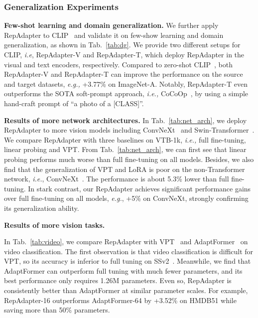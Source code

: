  \subsubsection{Generalization Experiments}

  \textbf{Few-shot learning and domain generalization.} We further apply RepAdapter to CLIP~\cite{clip} and validate it on few-show learning and domain generalization, as shown in Tab.~\ref{tab:dg}.
We provide two different setups for CLIP, \emph{i.e},  RepAdapter-V and RepAdapter-T,  which deploy  RepAdapter in the visual  and text encoders, respectively.  Compared to zero-shot CLIP~\cite{clip},  both  RepAdapter-V and  RepAdapter-T can improve the performance on the source   and  target datasets, \emph{e.g.,}  +3.77\% on ImageNet-A.   Notably,   RepAdapter-T   even outperforms the  SOTA  soft-prompt approach, \emph{i.e.,} CoCoOp~\cite{cocoop}, by using  a simple  hand-craft prompt of  ``a photo of a [CLASS]''.   

   \textbf{Results of more network architectures.} In Tab.~\ref{tab:net_arch}, we deploy RepAdapter to more    vision models including   ConvNeXt~\cite{convnext} and Swin-Transformer~\cite{swin}. We compare RepAdapter with three baselines on VTB-1k, \emph{i.e.,}   full fine-tuning,   linear probing and VPT.  From Tab.~\ref{tab:net_arch}, we can first see that linear probing performs much worse than full fine-tuning on all models. Besides, we also find that the generalization of VPT and LoRA is poor on the non-Transformer network, \emph{i.e.}, ConvNeXt~\cite{convnext}. The performance is about 5.3\% lower than full fine-tuning. In stark contrast, our RepAdapter achieves significant performance gains  over full fine-tuning on all models, \emph{e.g.}, +5\% on ConvNeXt, strongly confirming its generalization ability. 

     \textbf{Results of more vision tasks.} 

  In Tab.~\ref{tab:video}, we compare RepAdapter  with VPT~\cite{vpt} and AdaptFormer~\cite{adaptformer}  on video classification. The first observation is that video classification is  difficult for VPT, so  its accuracy is inferior to   full tuning on SSv2~\cite{ssv2}.  Meanwhile, we find that AdaptFormer can outperform   full tuning with  much fewer parameters,   and  its   best performance only requires  1.26M parameters.  Even so, RepAdapter is consistently better  than AdaptFormer  at similar parameter scales. For example, RepAdapter-16  outperforms AdaptFormer-64 by +3.52\% on HMDB51 while  saving more than 50\% parameters. 

